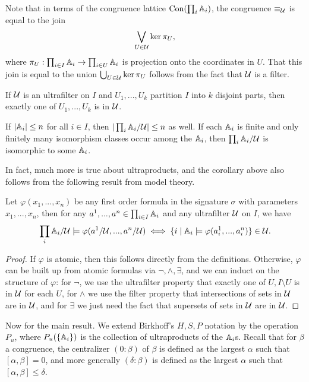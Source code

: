 \documentclass[letterpaper,11pt]{article}
\DeclareMathOperator{\Con}{Con}
\begin{document}
Note that in terms of the congruence lattice $\Con(\prod_i \bA_i)$, the congruence $\equiv_{\mathcal{U}}$ is equal to the join
\[
\bigvee_{U \in \mathcal{U}} \ker \pi_U,
\]
where $\pi_U : \prod_{i\in I} \mathbb{A}_i \rightarrow \prod_{i \in U} \mathbb{A}_i$ is projection onto the coordinates in $U$. That this join is equal to the union $\bigcup_{U \in \mathcal{U}} \ker \pi_U$ follows from the fact that $\mathcal{U}$ is a filter.

\begin{prop} If $\mathcal{U}$ is an ultrafilter on $I$ and $U_1, ..., U_k$ partition $I$ into $k$ disjoint parts, then exactly one of $U_1, ..., U_k$ is in $\mathcal{U}$.
\end{prop}

\begin{cor}\label{ultraproduct-finite} If $|\mathbb{A}_i| \le n$ for all $i \in I$, then $|\prod_i \mathbb{A}_i/\mathcal{U}| \le n$ as well. If each $\mathbb{A}_i$ is finite and only finitely many isomorphism classes occur among the $\mathbb{A}_i$, then $\prod_i \mathbb{A}_i/\mathcal{U}$ is isomorphic to some $\mathbb{A}_i$.
\end{cor}

In fact, much more is true about ultraproducts, and the corollary above also follows from the following result from model theory.

\begin{thm}[{\L}o\'s's Theorem] Let $\varphi(x_1, ..., x_n)$ be any first order formula in the signature $\sigma$ with parameters $x_1, ..., x_n$, then for any $a^1, ..., a^n \in \prod_{i \in I} \mathbb{A}_i$ and any ultrafilter $\mathcal{U}$ on $I$, we have
\[
\prod_i \mathbb{A}_i/\mathcal{U} \models \varphi(a^1/\mathcal{U}, ..., a^n/\mathcal{U}) \iff \{i \mid \mathbb{A}_i \models \varphi(a^1_i, ..., a^n_i)\} \in \mathcal{U}.
\]
\end{thm}
\begin{proof} If $\varphi$ is atomic, then this follows directly from the definitions. Otherwise, $\varphi$ can be built up from atomic formulas via $\neg, \wedge, \exists$, and we can induct on the structure of $\varphi$: for $\neg$, we use the ultrafilter property that exactly one of $U, I\setminus U$ is in $\mathcal{U}$ for each $U$, for $\wedge$ we use the filter property that intersections of sets in $\mathcal{U}$ are in $\mathcal{U}$, and for $\exists$ we just need the fact that supersets of sets in $\mathcal{U}$ are in $\mathcal{U}$.
\end{proof}

Now for the main result. We extend Birkhoff's $H,S,P$ notation by the operation $P_u$, where $P_u(\{\mathbb{A}_i\})$ is the collection of ultraproducts of the $\mathbb{A}_i$s. Recall that for $\beta$ a congruence, the centralizer $(0:\beta)$ of $\beta$ is defined as the largest $\alpha$ such that $[\alpha,\beta] = 0$, and more generally $(\delta:\beta)$ is defined as the largest $\alpha$ such that $[\alpha,\beta] \le \delta$.
\end{document}
